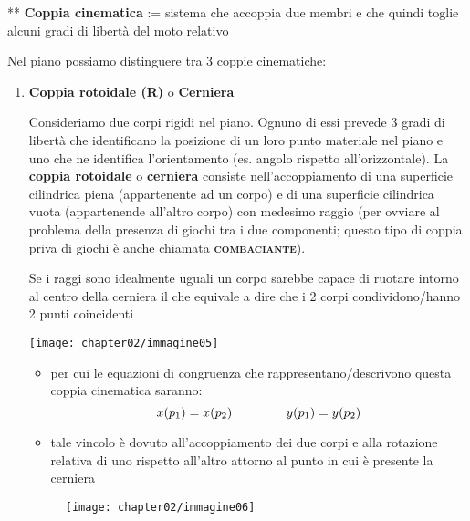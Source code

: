 			** \textbf{Coppia cinematica}\hspace{2mm} := sistema che accoppia due membri e che quindi toglie alcuni gradi di libertà del moto relativo 
	   
		Nel piano possiamo distinguere tra 3 coppie cinematiche:
\newpage

		\begin{enumerate}
			\item \textbf{Coppia rotoidale (R)} o \textbf{Cerniera}

				\begin{minipage}{.6\textwidth}	
					Consideriamo due corpi rigidi nel piano. Ognuno di essi prevede 3 gradi di libertà che identificano la posizione di un loro punto materiale nel piano
					e uno che ne identifica l'orientamento (es. angolo rispetto all'orizzontale).\newline
					La \textbf{coppia rotoidale} o \textbf{cerniera} consiste nell'accoppiamento di una superficie cilindrica piena (appartenente ad un corpo) e di una superficie cilindrica vuota (appartenende all'altro corpo)
					con medesimo raggio (per ovviare al problema della presenza di giochi tra i due componenti; questo tipo di coppia priva di giochi è anche chiamata {\scshape{\bfseries combaciante}}).
					
					Se i raggi sono idealmente uguali un corpo sarebbe capace di ruotare intorno al centro della cerniera il che equivale a dire che i 2 corpi condividono/hanno 2 punti coincidenti
				\end{minipage}
				\hfill
				\begin{minipage}{0.3\textwidth}
					\centering
					\texttt{[image: chapter02/immagine05]}
				\end{minipage}

				\begin{itemize}
					\item per cui le equazioni di congruenza che rappresentano/descrivono questa coppia cinematica saranno:
						\begin{equation*}
							x(p_1) = x(p_2) \hspace{1.5cm}  y(p_1) = y(p_2)
						\end{equation*}
					\item tale vincolo è dovuto all'accoppiamento dei due corpi e alla rotazione relativa di uno rispetto all'altro attorno al punto in cui è presente la cerniera
				\end{itemize}

			\begin{figure}[h]
				\centering
				\texttt{[image: chapter02/immagine06]}
			\end{figure}


\end{enumerate}
